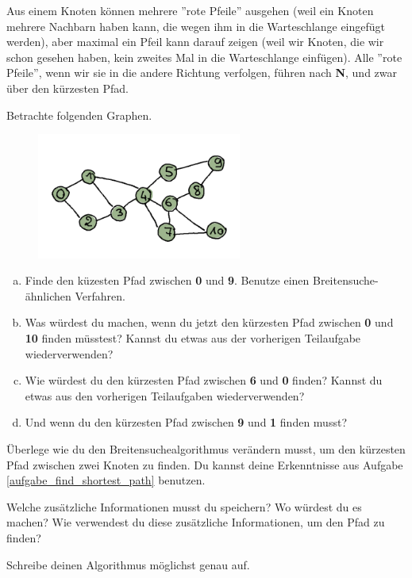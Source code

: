 Aus einem Knoten können mehrere ''rote Pfeile'' ausgehen (weil ein Knoten mehrere Nachbarn haben kann, die wegen ihm in die Warteschlange eingefügt werden), aber maximal ein Pfeil kann darauf zeigen (weil wir Knoten, die wir schon gesehen haben, kein zweites Mal in die Warteschlange einfügen). Alle ''rote Pfeile'', wenn wir sie in die andere Richtung verfolgen, führen nach \textbf{N}, und zwar über den kürzesten Pfad.

\begin{aufgabe}\label{aufgabe_find_shortest_path}
Betrachte folgenden Graphen. 
\begin{figure}[H]
    \centering
    \includegraphics[width=0.6\textwidth]{Pictures/SP/shortest_path_graph.png}
\end{figure}
\begin{enumerate}[(a)]
    \item Finde den küzesten Pfad zwischen \textbf{0} und \textbf{9}. Benutze einen Breitensuche-ähnlichen Verfahren.
    \item Was würdest du machen, wenn du jetzt den kürzesten Pfad zwischen \textbf{0} und \textbf{10} finden müsstest? Kannst du etwas aus der vorherigen Teilaufgabe wiederverwenden?
    \item Wie würdest du den kürzesten Pfad zwischen \textbf{6} und \textbf{0} finden? Kannst du etwas aus den vorherigen Teilaufgaben wiederverwenden?
    \item Und wenn du den kürzesten Pfad zwischen \textbf{9} und \textbf{1} finden musst?
\end{enumerate}{}
\end{aufgabe}

\begin{aufgabe}\label{aufgabe_shortest_path_alg}
Überlege wie du den Breitensuchealgorithmus verändern musst, um den kürzesten Pfad zwischen zwei Knoten zu finden. Du kannst deine Erkenntnisse aus Aufgabe \ref{aufgabe_find_shortest_path} benutzen.

Welche zusätzliche Informationen musst du speichern? Wo würdest du es machen?
Wie verwendest du diese zusätzliche Informationen, um den Pfad zu finden?

Schreibe deinen Algorithmus möglichst genau auf.
\end{aufgabe}



